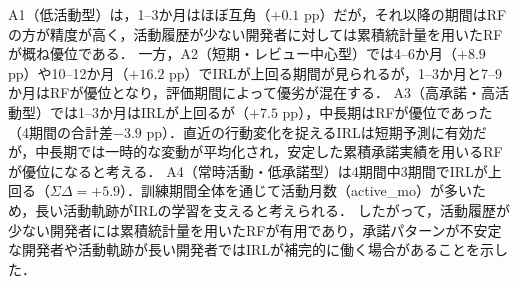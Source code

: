 \documentclass[submit,noauthor,ses,dvipdfmx]{ipsj}
\newcommand{\todo}[1]{\colorbox{yellow}{{\bf TODO}:}{\color{red} {\textbf{[#1]}}}}
\begin{document}
A1（低活動型）は，1--3か月はほぼ互角（$+0.1$ pp）だが，それ以降の期間はRFの方が精度が高く，活動履歴が少ない開発者に対しては累積統計量を用いたRFが概ね優位である．
一方，A2（短期・レビュー中心型）では4--6か月（$+8.9$ pp）や10--12か月（$+16.2$ pp）でIRLが上回る期間が見られるが，1--3か月と7--9か月はRFが優位となり，評価期間によって優劣が混在する．
A3（高承諾・高活動型）では1--3か月はIRLが上回るが（$+7.5$ pp），中長期はRFが優位であった（4期間の合計差$-3.9$ pp）．直近の行動変化を捉えるIRLは短期予測に有効だが，中長期では一時的な変動が平均化され，安定した累積承諾実績を用いるRFが優位になると考える．
A4（常時活動・低承諾型）は4期間中3期間でIRLが上回る（$\Sigma\Delta = +5.9$）．訓練期間全体を通じて活動月数（active\_mo）が多いため，長い活動軌跡がIRLの学習を支えると考えられる．
したがって，活動履歴が少ない開発者には累積統計量を用いたRFが有用であり，承諾パターンが不安定な開発者や活動軌跡が長い開発者ではIRLが補完的に働く場合があることを示した．





\end{document}
